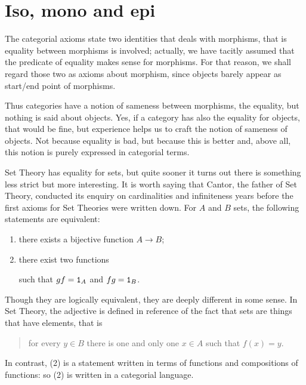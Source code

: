 
\section{Iso, mono and epi}

The categorial axioms state two identities that deals with morphisms, that is equality between morphisms is involved; actually, we have tacitly assumed that the predicate of equality makes sense for morphisms. For that reason, we shall regard those two as axioms about morphism, since objects barely appear as start/end point of morphisms.

Thus categories have a notion of sameness between morphisms, the equality, but nothing is said about objects. Yes, if a category has also the equality for objects, that would be fine, but experience helps us to craft the  notion of sameness of objects. Not because equality is bad, but because this is better and, above all, this notion is purely expressed in categorial terms.

\begin{example}
Set Theory has equality for sets, but quite sooner it turns out there is something less strict but more interesting. It is worth saying that Cantor, the father of Set Theory, conducted its enquiry on cardinalities and infiniteness years before the first axioms for Set Theories were written down. For \(A\) and \(B\) sets, the following statements are equivalent:
\begin{enumerate}
\item there exists a bijective function \(A \to B\);
\item there exist two functions
such that \(g f = \mathtt 1_A\) and \(fg = \mathtt 1_B\).
\end{enumerate}
Though they are logically equivalent, they are deeply different in some sense. In Set Theory, the adjective  is defined in reference of the fact that sets are things that have elements, that is
\begin{quotation}
for every \(y \in B\) there is one and only one \(x \in A\) such that \(f(x) = y\).
\end{quotation}
In contrast, (2) is a statement written in terms of functions and compositions of functions: so (2) is written in a categorial language.
\end{example}

